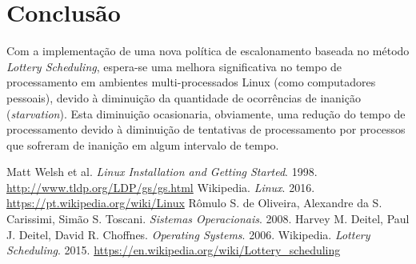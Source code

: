 \documentclass[a4paper,12pt]{article}
\begin{document}
\section{Conclusão}
Com a implementação de uma nova política de escalonamento baseada no método \emph{Lottery Scheduling}, espera-se uma melhora significativa no tempo de processamento em ambientes multi-processados Linux (como computadores pessoais), devido à diminuição da quantidade de ocorrências de inanição (\emph{starvation}). Esta diminuição ocasionaria, obviamente, uma redução do tempo de processamento devido à diminuição de tentativas de processamento por processos que sofreram de inanição em algum intervalo de tempo.

\begin{thebibliography}{9}
 Matt Welsh et al. \emph{Linux Installation and Getting Started}. 1998. \url{http://www.tldp.org/LDP/gs/gs.html}
 Wikipedia. \emph{Linux}. 2016. \url{https://pt.wikipedia.org/wiki/Linux}
 Rômulo S. de Oliveira, Alexandre da S. Carissimi, Simão S. Toscani. \emph{Sistemas Operacionais}. 2008.
 Harvey M. Deitel, Paul J. Deitel, David R. Choffnes. \emph{Operating Systems}. 2006.
 Wikipedia. \emph{Lottery Scheduling}. 2015. \url{https://en.wikipedia.org/wiki/Lottery_scheduling}
\end{thebibliography}
\end{document}
